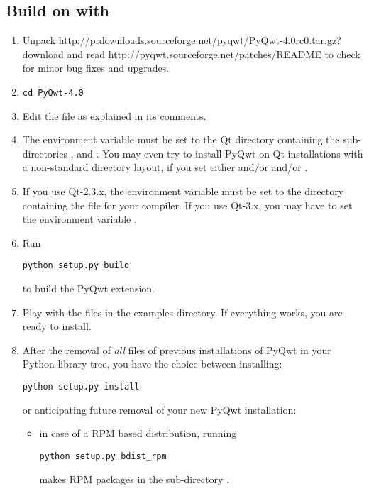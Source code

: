 \documentclass{manual}
\newcommand{\Download}{\ulink{download}
  {http://pyqwt.sourceforge.net/download.html}}
\newcommand{\PyQwtTarGz}{\ulink{PyQwt-4.0rc0.tar.gz}
  {http://prdownloads.sourceforge.net/pyqwt/PyQwt-4.0rc0.tar.gz?download}}
\newcommand{\ReadMePatches}{\ulink{README}
  {http://pyqwt.sourceforge.net/patches/README}}
\newcommand{\Future}{
  \begin{notice}[warning]
    This documentation is for the future PyQwt-4.0 which is only available from
    CVS. The \Download{} page has links for the latest releases.
  \end{notice}
}
\renewcommand{\Future}{}
\begin{document}
\subsection{Build on \POSIX{} with \label{posix-setup}}

\Future{}

\begin{enumerate}
\item
  Unpack \PyQwtTarGz{} and read \ReadMePatches{} to check for minor bug fixes
  and upgrades.
\item
\begin{verbatim}
cd PyQwt-4.0
\end{verbatim}
  {}
\item
  Edit the file  as explained in its comments.
  
\item
  The environment variable  must be set to the Qt directory
  containing the sub-directories ,  and .
  You may even try to install PyQwt on Qt installations with a non-standard
  directory layout, if you set either  and/or
   and/or .
\item
  If you use Qt-2.3.x, the environment variable  must be set
  to the directory containing the file  for your compiler.
  If you use Qt-3.x, you may have to set the environment variable
  .
\item
  Run
\begin{verbatim}
python setup.py build
\end{verbatim}
  to build the PyQwt extension.
\item
  Play with the  files in the examples directory.
  If everything works, you are ready to install.
\item
  After the removal of \emph{all} files of previous installations of PyQwt
  in your Python library tree, you have the choice between installing:
\begin{verbatim}
python setup.py install
\end{verbatim}
  or anticipating future removal of your new PyQwt installation:
  \begin{itemize}
  \item
    in case of a RPM based distribution, running
\begin{verbatim}
python setup.py bdist_rpm
\end{verbatim}
    makes RPM packages in the sub-directory .

\end{itemize}
\end{enumerate}
\end{document}

